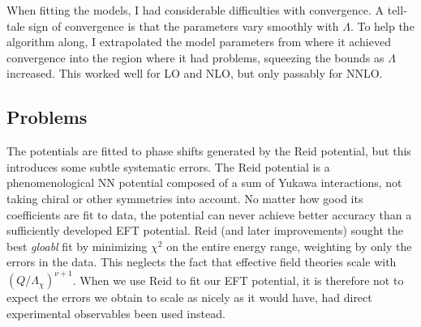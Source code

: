 When fitting the models, I had considerable difficulties with convergence. A
tell-tale sign of convergence is that the parameters vary smoothly with
\(\Lambda\). To help
the algorithm along, I extrapolated the model parameters from where it achieved
convergence into the region where it had problems, squeezing the bounds as
\(\Lambda\) increased. This worked well for LO and NLO, but only passably for
NNLO. 


\subsection{Problems}
The potentials are fitted to phase shifts generated by the Reid potential, but this introduces some
subtle systematic errors. The Reid potential is a phenomenological NN potential
composed of a sum of Yukawa interactions, not taking chiral or other symmetries into
account. No matter how good its coefficients are fit to data, the potential can
never achieve better accuracy than a sufficiently developed EFT potential. Reid (and later improvements) sought the best \textit{gloabl}
fit by minimizing \(\chi^{2}\) on the entire energy range, weighting by only the
errors in the data. This neglects the fact that effective field theories scale
with \((Q/\Lambda_{\chi})^{\nu+1}\). When we use Reid to fit our EFT potential,
it is therefore not to expect the errors we obtain to scale as nicely as it
would have, had direct experimental observables been used instead.

\FloatBarrier{}
